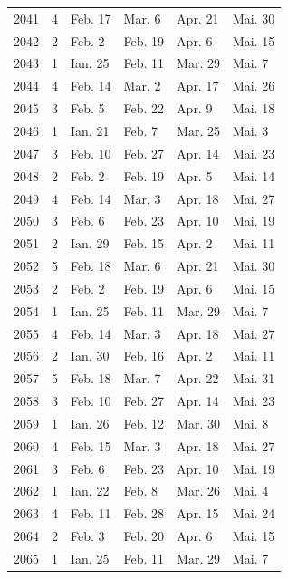 \begin{center}
\begin{tabular}{|c|c|l|l|l|l|}
\hline
2041 & 4 & Feb. 17 & Mar. 6 & Apr. 21 & Mai. 30 \\
2042 & 2 & Feb. 2 & Feb. 19 & Apr. 6 & Mai. 15 \\
2043 & 1 & Ian. 25 & Feb. 11 & Mar. 29 & Mai. 7 \\
2044 & 4 & Feb. 14 & Mar. 2 & Apr. 17 & Mai. 26 \\
2045 & 3 & Feb. 5 & Feb. 22 & Apr. 9 & Mai. 18 \\
\hline
2046 & 1 & Ian. 21 & Feb. 7 & Mar. 25 & Mai. 3 \\
2047 & 3 & Feb. 10 & Feb. 27 & Apr. 14 & Mai. 23 \\
2048 & 2 & Feb. 2 & Feb. 19 & Apr. 5 & Mai. 14 \\
2049 & 4 & Feb. 14 & Mar. 3 & Apr. 18 & Mai. 27 \\
2050 & 3 & Feb. 6 & Feb. 23 & Apr. 10 & Mai. 19 \\
\hline
2051 & 2 & Ian. 29 & Feb. 15 & Apr. 2 & Mai. 11 \\
2052 & 5 & Feb. 18 & Mar. 6 & Apr. 21 & Mai. 30 \\
2053 & 2 & Feb. 2 & Feb. 19 & Apr. 6 & Mai. 15 \\
2054 & 1 & Ian. 25 & Feb. 11 & Mar. 29 & Mai. 7 \\
2055 & 4 & Feb. 14 & Mar. 3 & Apr. 18 & Mai. 27 \\
\hline
2056 & 2 & Ian. 30 & Feb. 16 & Apr. 2 & Mai. 11 \\
2057 & 5 & Feb. 18 & Mar. 7 & Apr. 22 & Mai. 31 \\
2058 & 3 & Feb. 10 & Feb. 27 & Apr. 14 & Mai. 23 \\
2059 & 1 & Ian. 26 & Feb. 12 & Mar. 30 & Mai. 8 \\
2060 & 4 & Feb. 15 & Mar. 3 & Apr. 18 & Mai. 27 \\
\hline
2061 & 3 & Feb. 6 & Feb. 23 & Apr. 10 & Mai. 19 \\
2062 & 1 & Ian. 22 & Feb. 8 & Mar. 26 & Mai. 4 \\
2063 & 4 & Feb. 11 & Feb. 28 & Apr. 15 & Mai. 24 \\
2064 & 2 & Feb. 3 & Feb. 20 & Apr. 6 & Mai. 15 \\
2065 & 1 & Ian. 25 & Feb. 11 & Mar. 29 & Mai. 7 \\


\end{tabular}
\end{center}
